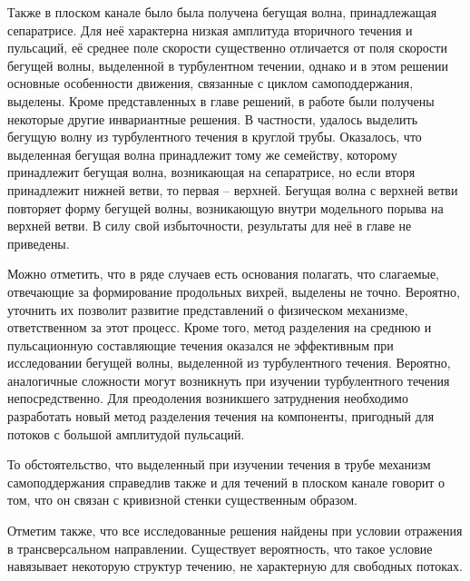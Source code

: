 Также в плоском канале было была получена бегущая волна, принадлежащая сепаратрисе. Для неё характерна низкая амплитуда вторичного течения и пульсаций, её среднее поле скорости существенно отличается от поля скорости бегущей волны, выделенной в турбулентном течении, однако и в этом решении основные особенности движения, связанные с циклом самоподдержания, выделены. Кроме представленных в главе решений, в работе были получены некоторые другие инвариантные решения. В частности, удалось выделить бегущую волну из турбулентного течения в круглой трубы. Оказалось, что выделенная бегущая волна принадлежит тому же семейству, которому принадлежит бегущая волна, возникающая на сепаратрисе, но если вторя принадлежит нижней ветви, то первая -- верхней. Бегущая волна с верхней ветви повторяет форму бегущей волны, возникающую внутри модельного порыва на верхней ветви. В силу свой избыточности, результаты для неё в главе не приведены. 

Можно отметить, что в ряде случаев есть основания полагать, что слагаемые, отвечающие за формирование продольных вихрей, выделены не точно. Вероятно, уточнить их позволит развитие представлений о физическом механизме, ответственном за этот процесс. Кроме того, метод разделения на среднюю и пульсационную составляющие течения оказался не эффективным при исследовании бегущей волны, выделенной из турбулентного течения. Вероятно, аналогичные сложности могут возникнуть при изучении турбулентного течения непосредственно. Для преодоления возникшего затруднения необходимо разработать новый метод разделения течения на компоненты, пригодный для потоков с большой амплитудой пульсаций.

То обстоятельство, что выделенный при изучении течения в трубе механизм самоподдержания справедлив также и для течений в плоском канале говорит о том, что он связан с кривизной стенки существенным образом. 

Отметим также, что все исследованные решения найдены при условии отражения в трансверсальном направлении. Существует вероятность, что такое условие навязывает некоторую структур течению, не характерную для свободных потоках. 






